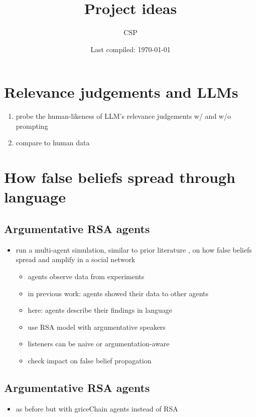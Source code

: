 \documentclass[fleqn,reqno,10pt]{article}
\title{Project ideas}
\author{CSP}
\date{Last compiled: \today}
\begin{document}
\maketitle

\section{Relevance judgements and LLMs}

\begin{enumerate}
  \item probe the human-likeness of LLM's relevance judgements w/ and w/o prompting
  \item compare to human data
\end{enumerate}

\section{How false beliefs spread through language}

\subsection{Argumentative RSA agents}

\begin{itemize}
  \item run a multi-agent simulation, similar to prior literature \citep{Zollman2013:Network-Epistem}, on how false beliefs spread and amplify in a social network
  \begin{itemize}
    \item agents observe data from experiments
    \item in previous work: agents showed their data to other agents
    \item here: agents describe their findings in language
    \item use RSA model with argumentative speakers
    \item listeners can be naive or argumentation-aware
    \item check impact on false belief propagation
  \end{itemize}
\end{itemize}

\subsection{Argumentative RSA agents}

\begin{itemize}
  \item as before but with griceChain agents instead of RSA
\end{itemize}
\end{document}
